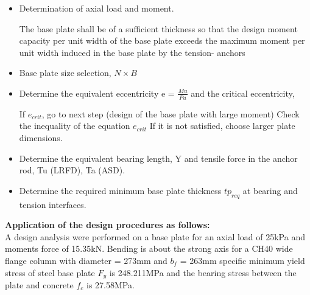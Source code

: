 {\begin{itemize}
    
\item Determination of axial load and moment.
	
The base plate shall be of a sufficient thickness so that the design moment capacity per unit width of the base plate exceeds the maximum moment per unit width induced in the base plate by the tension- anchors \cite{cook1989design} 

\item  Base plate size selection, \({N \times B}\) 

\item Determine the equivalent eccentricity e = \(\frac{Mu}{Pu}\) and the critical eccentricity,

 If \(e_{crit}\), go to next step (design of the base plate with large moment)
 Check the inequality of the equation \(e_{crit}\) If it is not satisﬁed, choose larger plate dimensions.
 
\item Determine the equivalent bearing length, Y and tensile force in the anchor rod, Tu (LRFD), Ta (ASD).

\item  Determine the required minimum base plate thickness \(tp_{req}\) at bearing and tension interfaces. 
\end{itemize}


\textbf{Application of the design procedures as follows:}\\
A design analysis were performed on a base plate for an axial load of 25kPa and moments force of 15.35kN. Bending is about the strong axis for a CH40 wide flange column with diameter = 273mm and  \(b_{f}\) = 263mm specific minimum yield stress of steel base plate \({F_y}\) is 248.211MPa and the bearing stress between the plate and concrete \(f_{c}\) is 27.58MPa.


}

